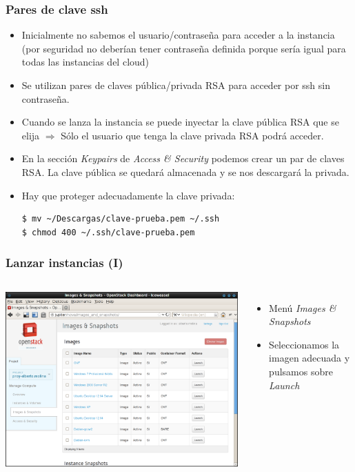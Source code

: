 \documentclass{beamer}
\begin{document}
\begin{frame}[fragile]
  \frametitle{Pares de clave ssh}
  \begin{itemize}
  \item Inicialmente no sabemos el usuario/contraseña para acceder a la
    instancia (por seguridad no deberían tener contraseña definida porque sería
    igual para todas las instancias del cloud)
  \item Se utilizan pares de claves pública/privada RSA para acceder por ssh sin
    contraseña. 
  \item Cuando se lanza la instancia se puede inyectar la clave pública RSA que
    se elija $\Rightarrow$ Sólo el usuario que tenga la clave privada RSA podrá
    acceder.
  \item En la sección \textit{Keypairs} de \textit{Access \& Security} podemos
    crear un par de claves RSA. La clave pública se quedará almacenada y se nos
    descargará la privada.
  \item Hay que proteger adecuadamente la clave privada:
\begin{verbatim}
$ mv ~/Descargas/clave-prueba.pem ~/.ssh
$ chmod 400 ~/.ssh/clave-prueba.pem
\end{verbatim}
  \end{itemize}
\end{frame}

\begin{frame}
  \frametitle{Lanzar instancias (I)}
  \begin{columns}
    \begin{center}
      \includegraphics[width=\columnwidth]{../img/horizon5.png}
    \end{center}
    \begin{itemize}
    \item Menú \textit{Images \& Snapshots}
    \item Seleccionamos la imagen adecuada y pulsamos sobre \textit{Launch}
    \end{itemize}
  \end{columns}
\end{frame}
\end{document}
